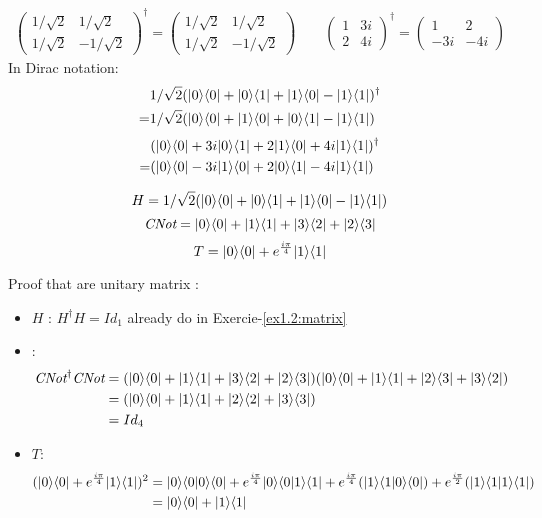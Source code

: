 \begin{align*}
\left(\begin{array}{cc}
 1/\sqrt{2}& 1/\sqrt{2}\\
 1/\sqrt{2}& -1/\sqrt{2}
\end{array}\right)^\dagger
=
\left(\begin{array}{cc}
 1/\sqrt{2}& 1/\sqrt{2}\\
 1/\sqrt{2}& -1/\sqrt{2}
\end{array}\right)
\qquad
\left(\begin{array}{cc}
 1& 3i\\
 2& 4i
\end{array}\right)^\dagger
=
\left(\begin{array}{cc}
 1& 2\\
 -3i& -4i
\end{array}\right)
\end{align*}
In Dirac notation:
\begin{align*}
  &1/\sqrt 2 (| 0 \rangle \langle 0 | + | 0 \rangle \langle 1 | + | 1 \rangle \langle 0 | - | 1 \rangle \langle 1 |)^\dagger \\
  =&1/\sqrt 2 (| 0 \rangle \langle 0 | + | 1 \rangle \langle 0 | + | 0 \rangle \langle 1 | - | 1 \rangle \langle 1 |)
\end{align*}
\begin{align*}
  &(| 0 \rangle \langle 0 | + 3i | 0 \rangle \langle 1 | + 2 | 1 \rangle \langle 0 | + 4i | 1 \rangle \langle 1 |)^\dagger \\
  =&(| 0 \rangle \langle 0 | - 3i | 1 \rangle \langle 0 | + 2 | 0 \rangle \langle 1 | - 4i | 1 \rangle \langle 1 |)
\end{align*}


$$ H = 1/\sqrt 2 (| 0 \rangle \langle 0 |+| 0 \rangle \langle 1 |+| 1 \rangle \langle 0 |-| 1 \rangle \langle 1 |)$$
$$ \textit{CNot} = | 0 \rangle \langle 0 |+| 1 \rangle \langle 1 |+| 3 \rangle \langle 2 |+| 2 \rangle \langle 3 |$$
$$ T = | 0 \rangle \langle 0 | + e^{\frac{i\pi}{4}} | 1 \rangle \langle 1 |$$

Proof that are unitary matrix :

\begin{itemize}
  \item $H$ : $H^\dagger H = Id_1$ already do in Exercie-\ref{ex1.2:matrix}
  \item \CNot :
    \begin{align*}
      \textit{CNot}^\dagger \textit{CNot} &= 
        (| 0 \rangle \langle 0 |+| 1 \rangle \langle 1 |+| 3 \rangle \langle 2 |+| 2 \rangle \langle 3 |)
        (| 0 \rangle \langle 0 |+| 1 \rangle \langle 1 |+| 2 \rangle \langle 3 |+| 3 \rangle \langle 2 |) \\
        &=(| 0 \rangle \langle 0 | + | 1 \rangle \langle 1 | + | 2 \rangle \langle 2 | + | 3 \rangle \langle 3 |) \\
        &= Id_4
    \end{align*}
  \item $T$:
    \begin{align*}
      (| 0 \rangle \langle 0 | + e^{\frac{i\pi}{4}} | 1 \rangle \langle 1 |)^2
      &= | 0 \rangle \langle 0 | 0 \rangle \langle 0 | + e^{\frac{i\pi}{4}} | 0 \rangle \langle 0 | 1 \rangle \langle 1 |
          + e^{\frac{i\pi}{4}}(| 1 \rangle \langle 1 | 0 \rangle \langle 0 |)
          + e^{\frac{i\pi}{2}}(| 1 \rangle \langle 1 | 1 \rangle \langle 1 |)\\
      &= | 0 \rangle \langle 0 | + | 1 \rangle \langle 1 |
    \end{align*}
\end{itemize}

